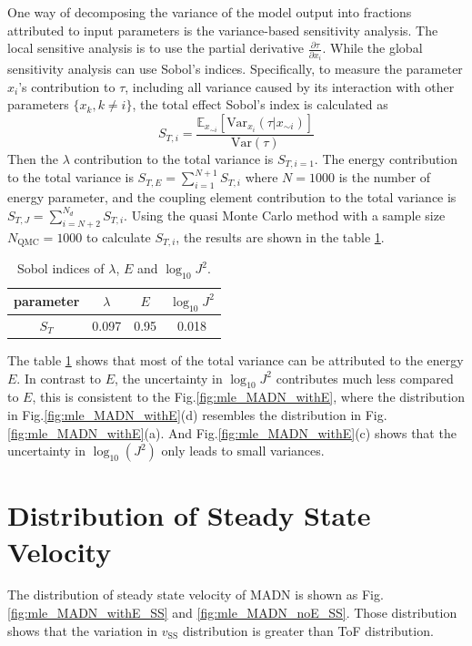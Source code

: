 \documentclass[letterpaper,12pt]{article}
\begin{document}
One way of decomposing the variance of the model output into fractions attributed to input parameters is the variance-based sensitivity analysis. The local sensitive analysis is to use the partial derivative $\frac{\partial \tau}{\partial x_i}$. While the global sensitivity analysis can use Sobol's indices. Specifically, to measure the parameter $x_i$'s contribution to $\tau$, including all variance caused by its interaction with other parameters $\{x_k, k \neq i \}$, the total effect Sobol's index is calculated as 
\begin{equation}
    S_{T,i} = \frac{ \mathbb{E}_{x_{\sim i}}[ \text{Var}_{x_i}(\tau|x_{\sim i}) ] }{ \text{Var}(\tau) }
    \label{eq:STi}
\end{equation}
Then the $\lambda$ contribution to the total variance is $S_{T,i=1}$.
The energy contribution to the total variance is $S_{T,E} = \sum\limits_{i=1}^{N+1} S_{T,i}$ where $N=1000$ is the number of energy parameter, and the coupling element contribution to the total variance is $S_{T,J}=\sum\limits_{i=N+2}^{N_d} S_{T,i}$. 
Using the quasi Monte Carlo method\cite{sobol_global_2001} with a sample size $N_\text{QMC}=1000$ to calculate $S_{T,i}$, the results are shown in the table \ref{tab:Sobol}.
%
\begin{table}[H]
    \centering
    \begin{tabular}{c c c c }
        \toprule
        parameter & $\lambda$ & $E$ & $\log_{10} J^2$   \\
        \midrule
        $S_T$ & 0.097 & 0.95 & 0.018\\
        \bottomrule
    \end{tabular}
        \caption{Sobol indices of $\lambda$, $E$ and $\log_{10} J^2$.}
        \label{tab:Sobol}
\end{table}
%
The table \ref{tab:Sobol} shows that most of the total variance can be attributed to the energy $E$. In contrast to $E$, the uncertainty in $\log_{10} J^2$ contributes much less compared to $E$, this is consistent to the Fig.\ref{fig:mle_MADN_withE}, where the distribution in Fig.\ref{fig:mle_MADN_withE}(d) resembles the distribution in Fig.\ref{fig:mle_MADN_withE}(a).
And Fig.\ref{fig:mle_MADN_withE}(c) shows that the uncertainty in $\log_{10}(J^2)$ only leads to small variances. 

\section{Distribution of Steady State Velocity}
The distribution of steady state velocity of MADN is shown as Fig.\ref{fig:mle_MADN_withE_SS} and \ref{fig:mle_MADN_noE_SS}. 
Those distribution shows that the variation in $v_\text{SS}$ distribution is greater than ToF distribution. 
\end{document}
